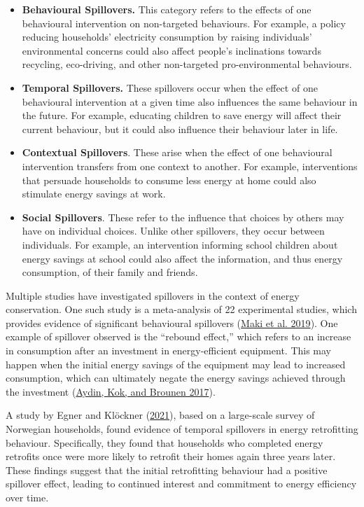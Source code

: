 \documentclass[
  11pt,
]{article}
\begin{document}
\begin{itemize}
\item
  \textbf{Behavioural Spillovers.} This category refers to the effects
  of one behavioural intervention on non-targeted behaviours. For
  example, a policy reducing households' electricity consumption by
  raising individuals' environmental concerns could also affect people's
  inclinations towards recycling, eco-driving, and other non-targeted
  pro-environmental behaviours.
\item
  \textbf{Temporal Spillovers.} These spillovers occur when the effect
  of one behavioural intervention at a given time also influences the
  same behaviour in the future. For example, educating children to save
  energy will affect their current behaviour, but it could also
  influence their behaviour later in life.
\item
  \textbf{Contextual Spillovers}. These arise when the effect of one
  behavioural intervention transfers from one context to another. For
  example, interventions that persuade households to consume less energy
  at home could also stimulate energy savings at work.
\item
  \textbf{Social Spillovers}. These refer to the influence that choices
  by others may have on individual choices. Unlike other spillovers,
  they occur between individuals. For example, an intervention informing
  school children about energy savings at school could also affect the
  information, and thus energy consumption, of their family and friends.
\end{itemize}

Multiple studies have investigated spillovers in the context of energy
conservation. One such study is a meta-analysis of 22 experimental
studies, which provides evidence of significant behavioural spillovers
(\protect\hyperlink{ref-maki2019meta}{Maki et al. 2019}). One example of
spillover observed is the ``rebound effect,'' which refers to an
increase in consumption after an investment in energy-efficient
equipment. This may happen when the initial energy savings of the
equipment may lead to increased consumption, which can ultimately negate
the energy savings achieved through the investment
(\protect\hyperlink{ref-aydin2017energy}{Aydin, Kok, and Brounen 2017}).

A study by Egner and Klöckner
(\protect\hyperlink{ref-egner2021temporal}{2021}), based on a
large-scale survey of Norwegian households, found evidence of temporal
spillovers in energy retrofitting behaviour. Specifically, they found
that households who completed energy retrofits once were more likely to
retrofit their homes again three years later. These findings suggest
that the initial retrofitting behaviour had a positive spillover effect,
leading to continued interest and commitment to energy efficiency over
time.
\end{document}
